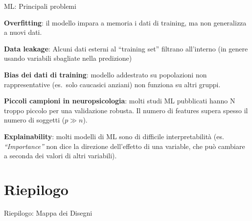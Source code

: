 \documentclass[
  ignorenonframetext,
]{beamer}
\begin{document}
\begin{frame}{ML: Principali problemi}
\label{ml-principali-problemi}
\small

\textbf{Overfitting}: il modello impara a memoria i dati di training, ma
non generalizza a nuovi dati.

\vspace{0.25em}

\textbf{Data leakage}: Alcuni dati esterni al ``training set'' filtrano
all'interno (in genere usando variabili sbagliate nella predizione)

\vspace{0.25em}

\textbf{Bias dei dati di training}: modello addestrato su popolazioni
non rappresentative (es.~solo caucasici anziani) non funziona su altri
gruppi.

\vspace{0.25em}

\textbf{Piccoli campioni in neuropsicologia}: molti studi ML pubblicati
hanno N troppo piccolo per una validazione robusta. Il numero di
features supera spesso il numero di soggetti (\(p \gg n\)).

\vspace{0.25em}

\textbf{Explainability}: molti modelli di ML sono di difficile
interpretabilità (es. \emph{``Importance''} non dice la direzione
dell'effetto di una variable, che può cambiare a seconda dei valori di
altri variabili).
\end{frame}

\section{Riepilogo}\label{riepilogo}

\begin{frame}{Riepilogo: Mappa dei Disegni}
\label{riepilogo-mappa-dei-disegni}
\begin{center}
\end{center}
\end{frame}
\end{document}
